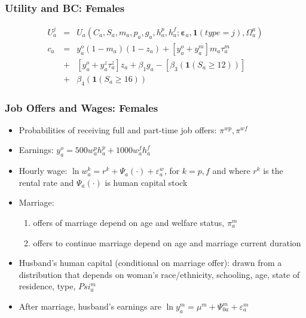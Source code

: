\begin{frame}
	\frametitle{Utility and BC: Females}
	\begin{eqnarray}
	U_{a}^j &=& U_{a} \left( C_{a}, S_{a}, m_{a}, p_{a}, g_{a}, h_{a}^p, h_{a}^f; \mathbf{\varepsilon}_{a}, \mathbf{1}(type=j), \Omega_{a}^a \right) \nonumber \\
c_{a} &=& y_{a}^o (1 - m_{a})(1 - z_{a}) + \left[ y_{a}^o + y_{a}^m\right]m_{a}\tau_{a}^m \nonumber \\
	                  &+& \left[ y_{a}^o + y_{a}^z \tau_{a}^z \right]z_{a} + \beta_{1}g_{a} - [\beta_{3}  \left( \mathbf{1}(S_{a} \geq 12) \right) ] \nonumber \\ 
	                 &+& \beta_{4} \left( \mathbf{1}(S_{a} \geq 16) \right) \nonumber
	\end{eqnarray}
	
\end{frame}


\begin{frame}
	\frametitle{Job Offers and Wages: Females}
	\begin{itemize}
		\item Probabilities of receiving full and part-time job offers: $\pi^{wp}, \pi^{wf}$
		\item Earnings: $y_{a}^o = 500w_{a}^ph_{a}^p + 1000w_{a}^fh_{a}^f $
		\item Hourly wage: $\ln w_{a}^k = r^k + \Psi_{a}(\cdot) + \varepsilon_{a}^{w}$, for $k = p,f$ and where $r^k$ is the rental rate and $\Psi_{a}(\cdot)$ is human capital stock
		\item Marriage: 
			\begin{enumerate}
			\item offers of marriage depend on age and welfare status, $\pi_{a}^m$
			\item offers to continue marriage depend on age and marriage current duration
			\end{enumerate}
		\item Husband's human capital (conditional on marriage offer): drawn from a distribution that depends on woman's race/ethnicity, schooling, age, state of residence, type, $Psi_{a}^m$
		\item After marriage, husband's earnings are $\ln y_{a}^m = \mu^m + \Psi_{0a}^m + \varepsilon_{a}^m$ 					
		\end{itemize}
\end{frame}

